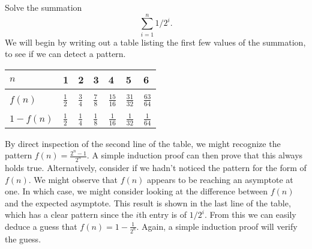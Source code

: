 \begin{example}
Solve the summation
\[ \sum_{i=1}^n 1/2^i. \]
\noindent
We will begin by writing out a table listing the first few values of
the summation, to see if we can detect a pattern.

\medskip

\begin{center}
\begin {tabular}{l|l l l l l l }
\baselineskip=20pt
$n$ & 1 &2 &3 &4 &5 &6\\
\hline
\\[-10pt]
$f(n)$& $\frac{1}{2}$ &$\frac{3}{4}$ &$\frac{7}{8}$ &$\frac{15}{16}$
&$\frac{31}{32}$ &$\frac{63}{64}$\\[3pt]
\hline
\\[-12pt]
$1-f(n)$ & $\frac{1}{2}$ & $\frac{1}{4}$ & $\frac{1}{8}$ &
$\frac{1}{16}$ & $\frac{1}{32}$ & $\frac{1}{64}$\\
\end {tabular}
\end{center}

\medskip

\noindent By direct inspection of the second line of the table,
we might recognize the pattern
$f(n) = \frac{2^n-1}{2^n}$.
A simple induction proof can then prove that this always holds
true.
Alternatively, consider if we hadn't noticed the pattern for the form
of $f(n)$.
We might observe that $f(n)$ appears to be reaching an asymptote at
one.
In which case, we might consider looking at the difference between
$f(n)$ and the expected asymptote.
This result is shown in the last line of the table, which has a clear
pattern since the $i$th entry is of $1/2^i$.
From this we can easily deduce a guess that
$f(n) = 1 - \frac{1}{2^n}$.
Again, a simple induction proof will verify the guess.
\end{example}

